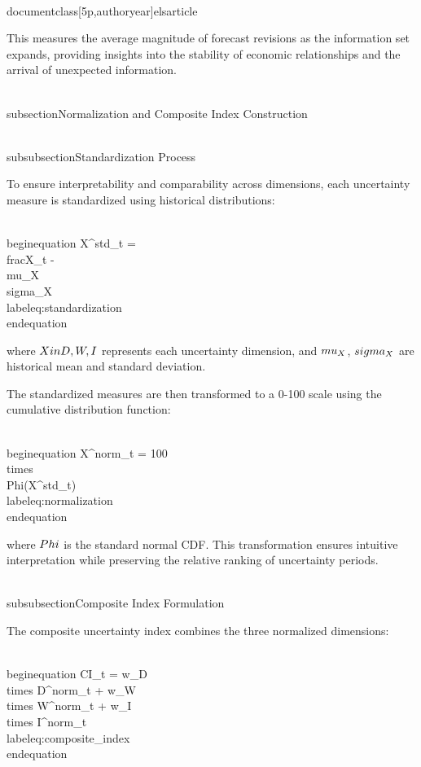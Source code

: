 \\documentclass[5p,authoryear]{elsarticle}
\begin{document}
This measures the average magnitude of forecast revisions as the information set expands, providing insights into the stability of economic relationships and the arrival of unexpected information.

\\subsection{Normalization and Composite Index Construction}

\\subsubsection{Standardization Process}

To ensure interpretability and comparability across dimensions, each uncertainty measure is standardized using historical distributions:

\\begin{equation}
X^{std}_{t} = \\frac{X_t - \\mu_X}{\\sigma_X}
\\label{eq:standardization}
\\end{equation}

where $X \\in \\{D, W, I\\}$ represents each uncertainty dimension, and $\\mu_X$, $\\sigma_X$ are historical mean and standard deviation.

The standardized measures are then transformed to a 0-100 scale using the cumulative distribution function:

\\begin{equation}
X^{norm}_{t} = 100 \\times \\Phi(X^{std}_{t})
\\label{eq:normalization}
\\end{equation}

where $\\Phi$ is the standard normal CDF. This transformation ensures intuitive interpretation while preserving the relative ranking of uncertainty periods.

\\subsubsection{Composite Index Formulation}

The composite uncertainty index combines the three normalized dimensions:

\\begin{equation}
CI_t = w_D \\times D^{norm}_t + w_W \\times W^{norm}_t + w_I \\times I^{norm}_t
\\label{eq:composite_index}
\\end{equation}
\end{document}

